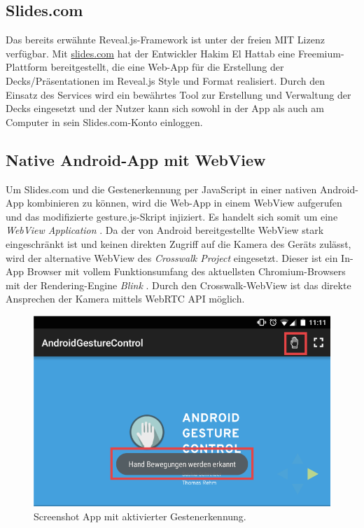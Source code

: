 \documentclass{article}
\begin{document}
\subsection{Slides.com}
Das bereits erwähnte Reveal.js-Framework ist unter der freien MIT Lizenz verfügbar. Mit \url{slides.com} hat der Entwickler Hakim El Hattab eine Freemium-Plattform bereitgestellt, die eine Web-App für die Erstellung der Decks/Präsentationen im Reveal.js Style und Format realisiert. Durch den Einsatz des Services wird ein bewährtes Tool zur Erstellung und Verwaltung der Decks eingesetzt und der Nutzer kann sich sowohl in der App als auch am Computer in sein Slides.com-Konto einloggen.


\subsection{Native Android-App mit WebView}
Um Slides.com und die Gestenerkennung per JavaScript in einer nativen Android-App kombinieren zu können, wird die Web-App in einem WebView aufgerufen und das modifizierte gesture.js-Skript injiziert. Es handelt sich somit um eine \textit{WebView Application} \cite{webview14}. Da der von Android  bereitgestellte WebView stark eingeschränkt ist und keinen direkten Zugriff auf die Kamera des Geräts zulässt, wird der alternative WebView des \textit{Crosswalk Project} \cite{Intel} eingesetzt. Dieser ist ein In-App Browser mit vollem Funktionsumfang des aktuellsten Chromium-Browsers mit der Rendering-Engine \textit{Blink} \cite{blink}. Durch den Crosswalk-WebView ist das direkte Ansprechen der Kamera mittels WebRTC API möglich.

\begin{figure}[htb]
\begin{minipage}[b]{1.0\linewidth}
  \centering
\centerline{\includegraphics[width=1\linewidth]{screenshot-ui-toast-quer.png}}
\end{minipage}
\caption{Screenshot App mit aktivierter Gestenerkennung.}
\label{fig:toast}
\end{figure}
\end{document}
